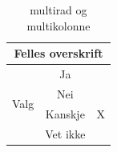 \begin{table}[!htb]
    \centering
    \caption{multirad og multikolonne}
    \label{tab:inl_multi_tabell}
    \begin{tabular}{|c|c|c|} 
        \hline
        \multicolumn{3}{|c|}{\textbf{Felles overskrift}} \\ \hline
        \multirow{4}{3cm}{\centering Valg}  & Ja &  \\ \cline{2-3}
                                            & Nei & \\ \cline{2-3}
                                            & Kanskje & X \\ \cline{2-3}
                                            & Vet ikke & \\ \hline
    \end{tabular}
\end{table}